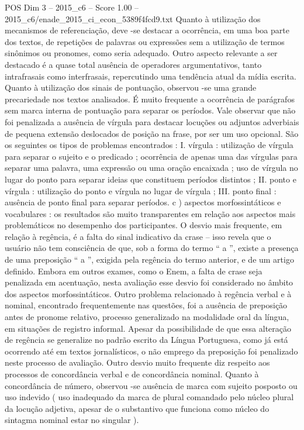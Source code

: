\begin{textsample}{POS Dim 3 – 2015\_c6 – Score 1.00 – 2015\_c6/enade\_2015\_ci\_econ\_5389f4fcd9.txt}
Quanto à utilização dos mecanismos de referenciação, deve -se destacar a ocorrência, em uma boa parte dos textos, de repetições de palavras ou expressões sem a utilização de termos sinônimos ou pronomes, como seria adequado.
Outro aspecto relevante a ser destacado é a quase total ausência de operadores argumentativos, tanto intrafrasais como interfrasais, repercutindo uma tendência atual da mídia escrita.
Quanto à utilização dos sinais de pontuação, observou -se uma grande precariedade nos textos analisados.
É muito frequente a ocorrência de parágrafos sem marca interna de pontuação para separar os períodos.
Vale observar que não foi penalizada a ausência de vírgula para destacar locuções ou adjuntos adverbiais de pequena extensão deslocados de posição na frase, por ser um uso opcional.
São os seguintes os tipos de problemas encontrados : I. vírgula : utilização de vírgula para separar o sujeito e o predicado ; ocorrência de apenas uma das vírgulas para separar uma palavra, uma expressão ou uma oração encaixada ; uso de vírgula no lugar do ponto para separar ideias que constituem períodos distintos ; II. ponto e vírgula : utilização do ponto e vírgula no lugar de vírgula ; III. ponto final : ausência de ponto final para separar períodos. c ) aspectos morfossintáticos e vocabulares : os resultados são muito transparentes em relação aos aspectos mais problemáticos no desempenho dos participantes.
O desvio mais frequente, em relação à regência, é a falta do sinal indicativo da crase – isso revela que o usuário não tem consciência de que, sob a forma do termo “ a ”, existe a presença de uma preposição “ a ”, exigida pela regência do termo anterior, e de um artigo definido.
Embora em outros exames, como o Enem, a falta de crase seja penalizada em acentuação, nesta avaliação esse desvio foi considerado no âmbito dos aspectos morfossintáticos.
Outro problema relacionado à regência verbal e à nominal, encontrado frequentemente nas questões, foi a ausência de preposição antes de pronome relativo, processo generalizado na modalidade oral da língua, em situações de registro informal.
Apesar da possibilidade de que essa alteração de regência se generalize no padrão escrito da Língua Portuguesa, como já está ocorrendo até em textos jornalísticos, o não emprego da preposição foi penalizado neste processo de avaliação.
Outro desvio muito frequente diz respeito aos processos de concordância verbal e de concordância nominal.
Quanto à concordância de número, observou -se ausência de marca com sujeito posposto ou uso indevido ( uso inadequado da marca de plural comandado pelo núcleo plural da locução adjetiva, apesar de o substantivo que funciona como núcleo do sintagma nominal estar no singular ).

\end{textsample}
